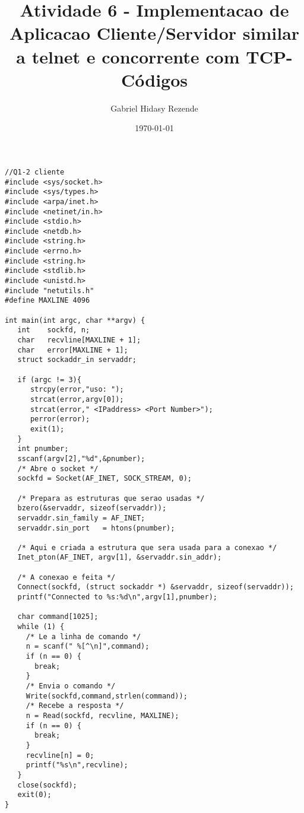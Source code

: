 \documentclass[11pt]{article}
\author{Gabriel Hidasy Rezende}
\date{\today}
\title{Atividade 6 - Implementacao de Aplicacao Cliente/Servidor similar a telnet e concorrente com TCP-
  Códigos}
\begin{document}
\maketitle

\begin{lstlisting}
//Q1-2 cliente
#include <sys/socket.h>
#include <sys/types.h>
#include <arpa/inet.h>
#include <netinet/in.h>
#include <stdio.h>
#include <netdb.h>
#include <string.h>
#include <errno.h>
#include <string.h>
#include <stdlib.h>
#include <unistd.h>
#include "netutils.h"
#define MAXLINE 4096

int main(int argc, char **argv) {
   int    sockfd, n;
   char   recvline[MAXLINE + 1];
   char   error[MAXLINE + 1];
   struct sockaddr_in servaddr;

   if (argc != 3){
      strcpy(error,"uso: ");
      strcat(error,argv[0]);
      strcat(error," <IPaddress> <Port Number>");
      perror(error);
      exit(1);
   }
   int pnumber;
   sscanf(argv[2],"%d",&pnumber);
   /* Abre o socket */
   sockfd = Socket(AF_INET, SOCK_STREAM, 0);

   /* Prepara as estruturas que serao usadas */
   bzero(&servaddr, sizeof(servaddr));
   servaddr.sin_family = AF_INET;
   servaddr.sin_port   = htons(pnumber);

   /* Aqui e criada a estrutura que sera usada para a conexao */
   Inet_pton(AF_INET, argv[1], &servaddr.sin_addr);

   /* A conexao e feita */
   Connect(sockfd, (struct sockaddr *) &servaddr, sizeof(servaddr));
   printf("Connected to %s:%d\n",argv[1],pnumber);

   char command[1025];
   while (1) {
     /* Le a linha de comando */
     n = scanf(" %[^\n]",command);
     if (n == 0) {
       break;
     }
     /* Envia o comando */
     Write(sockfd,command,strlen(command));
     /* Recebe a resposta */
     n = Read(sockfd, recvline, MAXLINE);
     if (n == 0) {
       break;
     }
     recvline[n] = 0;
     printf("%s\n",recvline);
   }
   close(sockfd);
   exit(0);
}

\end{lstlisting}
\end{document}
